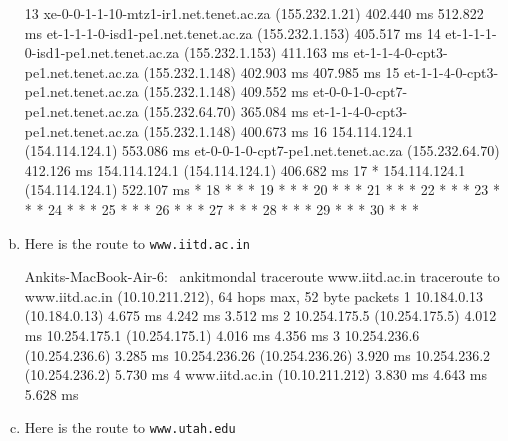\begin{enumerate}[a.]
\begin{code}
13  xe-0-0-1-1-10-mtz1-ir1.net.tenet.ac.za (155.232.1.21)  402.440 ms  512.822 ms
    et-1-1-1-0-isd1-pe1.net.tenet.ac.za (155.232.1.153)  405.517 ms
14  et-1-1-1-0-isd1-pe1.net.tenet.ac.za (155.232.1.153)  411.163 ms
    et-1-1-4-0-cpt3-pe1.net.tenet.ac.za (155.232.1.148)  402.903 ms  407.985 ms
15  et-1-1-4-0-cpt3-pe1.net.tenet.ac.za (155.232.1.148)  409.552 ms
    et-0-0-1-0-cpt7-pe1.net.tenet.ac.za (155.232.64.70)  365.084 ms
    et-1-1-4-0-cpt3-pe1.net.tenet.ac.za (155.232.1.148)  400.673 ms
16  154.114.124.1 (154.114.124.1)  553.086 ms
    et-0-0-1-0-cpt7-pe1.net.tenet.ac.za (155.232.64.70)  412.126 ms
    154.114.124.1 (154.114.124.1)  406.682 ms
17  * 154.114.124.1 (154.114.124.1)  522.107 ms *
18  * * *
19  * * *
20  * * *
21  * * *
22  * * *
23  * * *
24  * * *
25  * * *
26  * * *
27  * * *
28  * * *
29  * * *
30  * * *
\end{code}
\item Here is the route to {\tt www.iitd.ac.in}
\begin{code}
Ankits-MacBook-Air-6:~ ankitmondal traceroute www.iitd.ac.in
traceroute to www.iitd.ac.in (10.10.211.212), 64 hops max, 52 byte packets
 1  10.184.0.13 (10.184.0.13)  4.675 ms  4.242 ms  3.512 ms
 2  10.254.175.5 (10.254.175.5)  4.012 ms
    10.254.175.1 (10.254.175.1)  4.016 ms  4.356 ms
 3  10.254.236.6 (10.254.236.6)  3.285 ms
    10.254.236.26 (10.254.236.26)  3.920 ms
    10.254.236.2 (10.254.236.2)  5.730 ms
 4  www.iitd.ac.in (10.10.211.212)  3.830 ms  4.643 ms  5.628 ms
 \end{code}
 \item Here is the route to {\tt www.utah.edu}
 

\end{enumerate}
